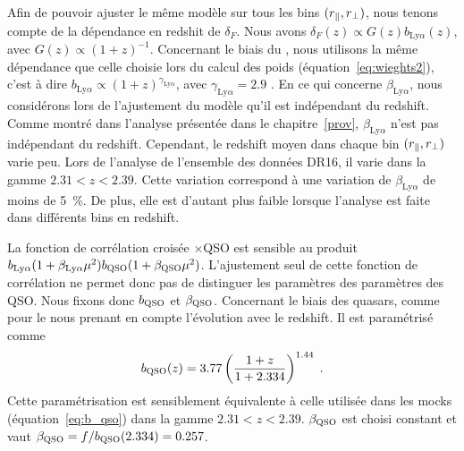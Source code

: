 \documentclass[11pt, twoside, a4paper, openright]{report}
\begin{document}
Afin de pouvoir ajuster le même modèle sur tous les bins $(r_{\parallel}{}, r_{\perp})$, nous tenons compte de la dépendance en redshit de $\delta_F$. Nous avons $\delta_F(z) \propto G(z) b_{\mathrm{Ly}\alpha}(z)$, avec $G(z) \propto (1+z)^{-1}$. Concernant le biais du \lya{}, nous utilisons la même dépendance que celle choisie lors du calcul des poids (équation~\ref{eq:wieghts2}), c'est à dire $b_{\mathrm{Ly}\alpha} \propto (1+z)^{\gamma_{\mathrm{Ly}\alpha}}$, avec $\gamma_{\mathrm{Ly}\alpha} = 2.9$ \citep{mcdonald_ly_2006}.
En ce qui concerne $\beta_{\mathrm{Ly}\alpha}$, nous considérons lors de l'ajustement du modèle qu'il est indépendant du redshift. Comme montré dans l'analyse présentée dans le chapitre~\ref{prov}, $\beta_{\mathrm{Ly}\alpha}$ n'est pas indépendant du redshift. Cependant, le redshift moyen dans chaque bin $(r_{\parallel}{}, r_{\perp})$ varie peu. Lors de l'analyse de l'ensemble des données DR16, il varie dans la gamme $\num{2.31} < z < \num{2.39}$. Cette variation correspond à une variation de $\beta_{\mathrm{Ly}\alpha}$ de moins de \SI{5}{\percent}. De plus, elle est d'autant plus faible lorsque l'analyse est faite dans différents bins en redshift.

La fonction de corrélation croisée \lya{}$\times$QSO est sensible au produit $b_{\mathrm{Ly}\alpha}(1+\beta_{\mathrm{Ly}\alpha} \mu^2) b_{\textsc{QSO}}(1+\beta_{\textsc{QSO}} \mu^2)$. L'ajustement seul de cette fonction de corrélation ne permet donc pas de distinguer les paramètres \lya{} des paramètres des QSO. Nous fixons donc $b_{\textsc{QSO}}$ et $\beta_{\textsc{QSO}}$. Concernant le biais des quasars, comme pour le \lya{} nous prenant en compte l'évolution avec le redshift. Il est paramétrisé comme
\begin{equation}
  b_{\textsc{QSO}}(z) = \num{3.77} \left( \frac{1 + z}{1+\num{2.334}} \right)^{\num{1.44}} \; . 
\end{equation}
Cette paramétrisation est sensiblement équivalente à celle utilisée dans les mocks (équation~\ref{eq:b_qso}) dans la gamme $\num{2.31} < z < \num{2.39}$. $\beta_{\textsc{QSO}}$ est choisi constant et vaut $\beta_{\textsc{QSO}} = f / b_{\textsc{QSO}}(\num{2.334}) = \num{0.257}$.
\end{document}
